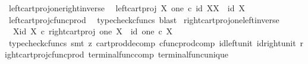 \begin{isabellebody}
\endisatagproof
{\isafoldproof}%
%
\isadelimproof
\isanewline
%
\endisadelimproof
\isanewline
{}\isamarkupfalse%
\ left{\isacharunderscore}{\kern0pt}cart{\isacharunderscore}{\kern0pt}proj{\isacharunderscore}{\kern0pt}one{\isacharunderscore}{\kern0pt}right{\isacharunderscore}{\kern0pt}inverse{\isacharcolon}{\kern0pt}\isanewline
\ \ {\isachardoublequoteopen}left{\isacharunderscore}{\kern0pt}cart{\isacharunderscore}{\kern0pt}proj\ X\ one\ {\isasymcirc}\isactrlsub c\ {\isasymlangle}id\ X{\isacharcomma}{\kern0pt}{\isasymbeta}\isactrlbsub X\isactrlesub {\isasymrangle}\ {\isacharequal}{\kern0pt}\ id\ X{\isachardoublequoteclose}\isanewline
%
\isadelimproof
\ \ %
\endisadelimproof
%
\isatagproof
{}\isamarkupfalse%
\ left{\isacharunderscore}{\kern0pt}cart{\isacharunderscore}{\kern0pt}proj{\isacharunderscore}{\kern0pt}cfunc{\isacharunderscore}{\kern0pt}prod\ \isamarkupfalse%
\ {\isacharparenleft}{\kern0pt}typecheck{\isacharunderscore}{\kern0pt}cfuncs{\isacharcomma}{\kern0pt}\ blast{\isacharparenright}{\kern0pt}%
\endisatagproof
{\isafoldproof}%
%
\isadelimproof
\isanewline
%
\endisadelimproof
\isanewline
{}\isamarkupfalse%
\ right{\isacharunderscore}{\kern0pt}cart{\isacharunderscore}{\kern0pt}proj{\isacharunderscore}{\kern0pt}one{\isacharunderscore}{\kern0pt}left{\isacharunderscore}{\kern0pt}inverse{\isacharcolon}{\kern0pt}\isanewline
\ \ {\isachardoublequoteopen}{\isasymlangle}{\isasymbeta}\isactrlbsub X\isactrlesub {\isacharcomma}{\kern0pt}id\ X{\isasymrangle}\ {\isasymcirc}\isactrlsub c\ right{\isacharunderscore}{\kern0pt}cart{\isacharunderscore}{\kern0pt}proj\ one\ X\ {\isacharequal}{\kern0pt}\ id\ {\isacharparenleft}{\kern0pt}one\ {\isasymtimes}\isactrlsub c\ X{\isacharparenright}{\kern0pt}{\isachardoublequoteclose}\isanewline
%
\isadelimproof
\ \ %
\endisadelimproof
%
\isatagproof
{}\isamarkupfalse%
\ {\isacharparenleft}{\kern0pt}typecheck{\isacharunderscore}{\kern0pt}cfuncs{\isacharcomma}{\kern0pt}\ smt\ {\isacharparenleft}{\kern0pt}z{}{\isacharparenright}{\kern0pt}\ cart{\isacharunderscore}{\kern0pt}prod{\isacharunderscore}{\kern0pt}decomp\ cfunc{\isacharunderscore}{\kern0pt}prod{\isacharunderscore}{\kern0pt}comp\ id{\isacharunderscore}{\kern0pt}left{\isacharunderscore}{\kern0pt}unit{}\ id{\isacharunderscore}{\kern0pt}right{\isacharunderscore}{\kern0pt}unit{}\ right{\isacharunderscore}{\kern0pt}cart{\isacharunderscore}{\kern0pt}proj{\isacharunderscore}{\kern0pt}cfunc{\isacharunderscore}{\kern0pt}prod\ terminal{\isacharunderscore}{\kern0pt}func{\isacharunderscore}{\kern0pt}comp\ terminal{\isacharunderscore}{\kern0pt}func{\isacharunderscore}{\kern0pt}unique{\isacharparenright}{\kern0pt}%

\end{isabellebody}
